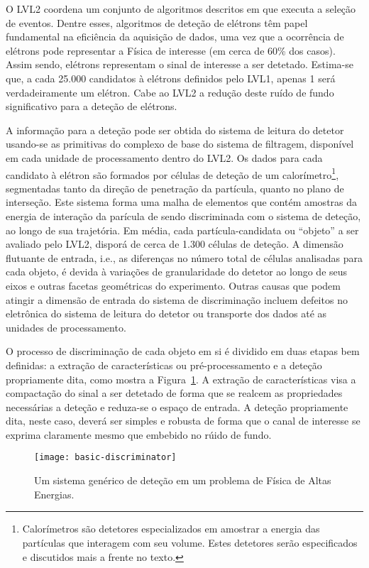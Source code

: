 O LVL2 coordena um conjunto de algoritmos descritos em  que
executa a seleção de eventos. Dentre esses, algoritmos de deteção de elétrons
têm papel fundamental na eficiência da aquisição de dados, uma vez que a
ocorrência de elétrons pode representar a Física de interesse (em cerca de
60\% dos casos). Assim sendo, elétrons representam o sinal de interesse a ser
detetado. Estima-se que, a cada 25.000 candidatos à elétrons definidos pelo
LVL1, apenas 1 será verdadeiramente um elétron. Cabe ao LVL2 a redução deste
ruído de fundo significativo para a deteção de elétrons.

A informação para a deteção pode ser obtida do sistema de leitura do detetor
usando-se as primitivas do complexo  de base do sistema de
filtragem, disponível em cada unidade de processamento dentro do LVL2. Os
dados para cada candidato à elétron são formados por células de deteção de um
calorímetro\footnote{Calorímetros são detetores especializados em amostrar a
energia das partículas que interagem com seu volume. Estes detetores serão
especificados e discutidos mais a frente no texto.}, segmentadas tanto da
direção de penetração da partícula, quanto no plano de interseção. Este
sistema forma uma malha de elementos que contém amostras da energia de
interação da parícula de sendo discriminada com o sistema de deteção, ao longo
de sua trajetória. Em média, cada partícula-candidata ou ``objeto'' a ser
avaliado pelo LVL2, disporá de cerca de 1.300 células de deteção. A dimensão
flutuante de entrada, i.e., as diferenças no número total de células
analisadas para cada objeto, é devida à variações de granularidade do detetor
ao longo de seus eixos e outras facetas geométricas do experimento. Outras
causas que podem atingir a dimensão de entrada do sistema de discriminação
incluem defeitos no eletrônica do sistema de leitura do detetor ou transporte
dos dados até as unidades de processamento.

O processo de discriminação de cada objeto em si é dividido em duas etapas bem
definidas: a extração de características ou pré-processamento e a deteção
propriamente dita, como mostra a Figura~\ref{fig:intro-disc}. A extração de
características visa a compactação do sinal a ser detetado de forma que se
realcem as propriedades necessárias a deteção e reduza-se o espaço de
entrada. A deteção propriamente dita, neste caso, deverá ser simples e robusta
de forma que o canal de interesse se exprima claramente mesmo que embebido no
rúido de fundo.

\begin{figure}
\begin{center}
\texttt{[image: basic-discriminator]}
\end{center}
\caption{Um sistema genérico de deteção em um problema de Física de Altas
Energias.}
\label{fig:intro-disc}
\end{figure}

